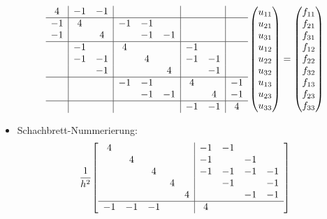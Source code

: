 \documentclass{exercise}
\begin{document}
\begin{itemize}
\[{\begin{array}{c|cc|ccc|cc|c}
                4 & -1 & -1 & & & & & &\\
                \hline
                -1 & 4 & & -1 & -1 & & & &\\
                -1 & & 4 & & -1 & -1 & & &\\
                \hline
                & -1 & & 4 & & & -1 & &\\
                & -1 & -1 & & 4 & & -1 & -1 &\\
                & & -1 & & & 4 & & -1 &\\
                \hline
                & & & -1 & -1 & & 4 & & -1\\
                & & & & -1 & -1 & & 4 & -1\\
                \hline
                & & & & & & -1 & -1 & 4
            \end{array}}\begin{pmatrix}
                u_{11}\\u_{21}\\u_{31}\\u_{12}\\u_{22}\\u_{32}\\u_{13}\\u_{23}\\u_{33}
            \end{pmatrix} = \begin{pmatrix}
                f_{11}\\f_{21}\\f_{31}\\f_{12}\\f_{22}\\f_{32}\\f_{13}\\f_{23}\\f_{33}
            \end{pmatrix}
        \]
        \item Schachbrett-Nummerierung:
        \[
            \frac{1}{h^2}\brackets*{\begin{array}{ccccc|cccc}
                4 & & & & & -1 & -1 & &\\
                & 4 & & & & -1 & & -1 &\\
                & & 4 & & & -1 & -1 & -1 & -1\\
                & & & 4 & & & -1 & & -1\\
                & & & & 4 & & & -1 & -1\\
                \hline
                -1 & -1 & -1 & & & 4 & & &\\

\end{array}}\]
\end{itemize}
\end{document}
